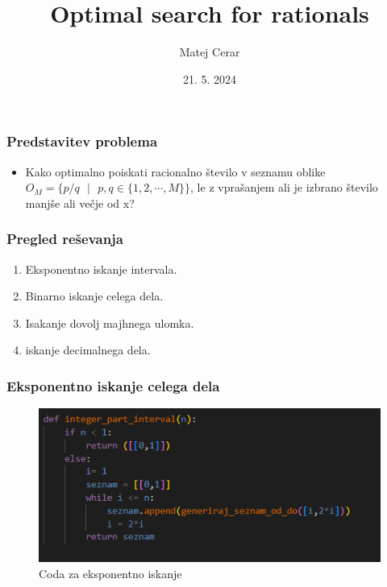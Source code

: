\documentclass[a4paper,14pt]{beamer}
\title{Optimal search for rationals}
\author{Matej Cerar}
\date{21. 5. 2024}
\begin{document}
\maketitle


\begin{frame}
    \frametitle{Predstavitev problema}
    \begin{itemize}
        \item Kako optimalno poiskati racionalno število v seznamu oblike 
        $O_M = \{ p/q \text{ }| \text{ }p,q \in \{1,2, \cdots, M\}\}$, le z vprašanjem ali je izbrano 
        število manjše ali večje od x?
    \end{itemize}
    
\end{frame}


\begin{frame}
    \frametitle{Pregled reševanja}
    \begin{enumerate}
        \item Eksponentno iskanje intervala.
        \item Binarno iskanje celega dela.
        \item Isakanje dovolj majhnega ulomka.
        \item iskanje decimalnega dela.

    \end{enumerate}
    
\end{frame}


\begin{frame}
    \frametitle{Eksponentno iskanje celega dela}
        \begin{figure}
            \centering
            \includegraphics[width = 1\textwidth]{eksponentno.png}
            \caption{Coda za eksponentno iskanje}
        \end{figure}
\end{frame}
\end{document}
